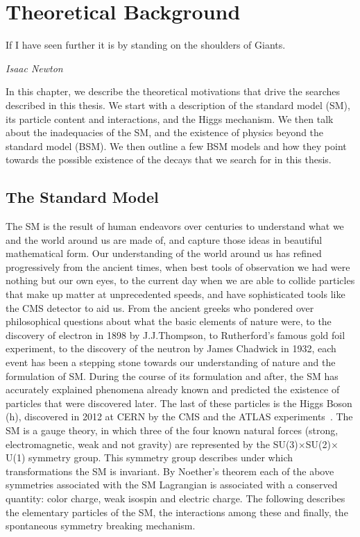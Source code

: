 %
%

\chapter{Theoretical Background}
\label{chap:theory}
\epigraph{If I have seen further it is by standing on the shoulders of Giants.}{\textit{Isaac Newton}}
In this chapter, we describe the theoretical motivations that drive the searches described in this thesis. We start with a description of the standard model (SM), its particle content and interactions, and the Higgs mechanism. We then talk about the inadequacies of the SM, and the existence of physics beyond the standard model (BSM). We then outline a few BSM models and how they point towards the possible existence of the decays that we search for in this thesis.  

\section{The Standard Model }
\label{sec:SM}
The SM is the result of human endeavors over centuries to understand what we and the world around us are made of, and capture those ideas in beautiful mathematical form. Our understanding of the world around us has refined progressively from the ancient times, when best tools of observation we had were nothing but our own eyes, to the current day when we are able to collide particles that make up matter at unprecedented speeds, and have sophisticated tools like the CMS detector to aid us. From the ancient greeks who pondered over philosophical questions about what the basic elements of nature were, to the discovery of electron in 1898 by J.J.Thompson, to Rutherford's famous gold foil experiment, to the discovery of the neutron by James Chadwick in 1932, each event has been a stepping stone towards our understanding of nature and the formulation of SM. During the course of its formulation and after, the SM has accurately explained phenomena already known and predicted the existence of particles that were discovered later. The last of these particles is the Higgs Boson (h), discovered in 2012 at CERN by the CMS and the ATLAS experiments~\cite{Aad:2012tfa, Chatrchyan:2012ufa, Chatrchyan:2013lba}. The SM is a gauge theory, in which three of the four known natural forces (strong, electromagnetic, weak and not gravity) are represented by the SU(3)$\times$SU(2)$\times$U(1) symmetry group. This symmetry group describes under which transformations the SM is invariant. By Noether's theorem each of the above symmetries associated with the SM Lagrangian is associated with a conserved quantity: color charge, weak isospin and electric charge. The following describes the elementary particles of the SM, the interactions among these and finally, the spontaneous symmetry breaking mechanism.


